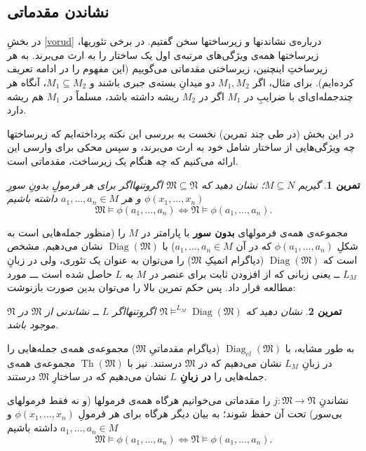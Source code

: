 \documentclass[12pt,a4paper]{report}
\theoremstyle{colorhead}
\newtheorem{tam}{تمرین}
\DeclareMathOperator{\Th}{Th}
\DeclareMathOperator{\diag}{Diag}
\begin{document}
\subsection{ نشاندن مقدماتی}
در بخشِ
\ref{vorud}
درباره‌ی نشاندنها و زیرساختها سخن گفتیم. در برخی تئوریها، زیرساختها همه‌ی ویژگی‌های مرتبه‌ی اول یک ساختار را به ارث می‌برند. به هر زیرساختِ اینچنین، زیرساختی مقدماتی می‌گوییم (این مفهوم را در ادامه تعریف کرده‌ایم).
برای مثال، اگر
$M_1,M_2$
دو میدانِ بسته‌ی جبری باشند و 
$M_1\subseteq M_2$،
آنگاه هر چندجمله‌ای‌ای با ضرایبِ در
$M_1$
اگر در
$M_2$
ریشه داشته باشد، مسلماً در
$M_1$
هم ریشه دارد. 
\par 
در این بخش  (در طی چند تمرین) نخست به بررسی این نکته پرداخته‌ایم که زیرساختها چه ويژگی‌هایی از
 ساختار شامل خود 
به ارث می‌برند،‌ و سپس محکی برای وارسی این ارائه می‌کنیم  که 
چه هنگام یک زیرساخت، مقدماتی است.
\begin{tam}
گیریم
$M\subseteq N$؛
نشان دهید که
$\mathfrak{M}\subseteq \mathfrak{N}$
اگروتنهااگر برای هر فرمولِ
بدونِ سورِ
$\phi(x_1,\ldots,x_n)$
و هر
$a_1,\ldots, a_n\in M$
داشته باشیم
\[
\mathfrak{M}\models \phi(a_1,\ldots,a_n)\Leftrightarrow\mathfrak{N}\models \phi(a_1,\ldots,a_n).
\]
\end{tam}
مجموعه‌ی همه‌ی فرمولهای \textbf{بدون سور} با پارامتر در
$M$
را 
(منظور جمله‌هایی است به شکلِ
$\phi(a_1,\ldots,a_n)$
که در آن
$a_1,\ldots,a_n\in M$)
با
$\diag(\mathfrak{M})$
نشان می‌دهیم. مشخص است که
$\diag(\mathfrak{M})$
(دیاگرام اتمیکِ
$\mathfrak{M}$)
را می‌توان به عنوان یک تئوری، ولی در زبانِ
$L_M$ ــ
یعنی زبانی که از افزودن ثابت برای عنصر در
$M$
به
$L$ 
حاصل شده است ـــ
 مورد مطالعه قرار داد.
پس حکم تمرین بالا را می‌توان بدین صورت بازنوشت:
\begin{tam}
نشان دهید که
$\mathfrak{N}\models^{L_M} \diag(\mathfrak{M})$
اگروتنهااگر 
$L$ ــ
نشاندنی از 
$\mathfrak{M}$
در
$\mathfrak{N}$
موجود باشد.
\end{tam}
\par 
به طور مشابه،‌ با
$\diag_{el}(\mathfrak{M})$
(دیاگرام مقدماتیِ
$\mathfrak{M}$)
مجموعه‌ی همه‌ی جمله‌هایی را در زبانِ
$L_M$
نشان می‌دهیم که در
$\mathfrak{M}$
درستند. 
نیز با
$\Th(\mathfrak{M})$
مجموعه‌ی همه‌ی جمله‌هایی را 
\textbf{در زبانِ
$L$}
نشان می‌دهیم که در ساختارِ
$\mathfrak{M}$
درستند. 
\par 
نشاندنِ
$j:\mathfrak{M}\to \mathfrak{N}$
را مقدماتی می‌خوانیم هرگاه همه‌ی فرمولها (و نه فقط فرمولهای بی‌سور) تحت آن حفظ شوند؛ به بیان دیگر هرگاه
برای هر فرمولِ
$\phi(x_1,\ldots,x_n)$
و
$a_1,\ldots,a_n\in M$
داشته باشیم
\[
\mathfrak{M}\models \phi(a_1,\ldots,a_n)\Leftrightarrow\mathfrak{N}\models
\phi(a_1,\ldots,a_n).
\]
\end{document}
